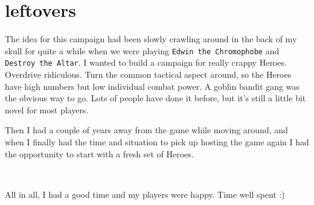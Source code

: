 \section*{leftovers}

The idea for this campaign had been slowly crawling around in the back of my skull for quite a while when we were playing \texttt{Edwin the Chromophobe} and \texttt{Destroy the Altar}. I wanted to build a campaign for really crappy Heroes. Overdrive ridiculous. Turn the common tactical aspect around, so the Heroes have high numbers but low individual combat power. A goblin bandit gang was the obvious way to go. Lots of people have done it before, but it's still a little bit novel for most players.

Then I had a couple of years away from the game while moving around, and when I finally had the time and situation to pick up hosting the game again I had the opportunity to start with a fresh set of Heroes.

\

All in all, I had a good time and my players were happy. Time well spent :)





